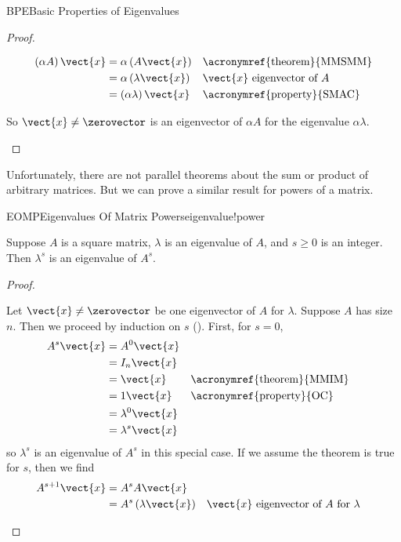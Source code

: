 \begin{subsect}{BPE}{Basic Properties of Eigenvalues}
\begin{proof}
\begin{para}
%
\begin{align*}
\left(\alpha A\right)\vect{x}&=\alpha\left(A\vect{x}\right)&&\text{\acronymref{theorem}{MMSMM}}\\
&=\alpha\left(\lambda\vect{x}\right)&&\text{$\vect{x}$ eigenvector of $A$}\\
&=\left(\alpha\lambda\right)\vect{x}&&\text{\acronymref{property}{SMAC}}
\end{align*}
\end{para}
%
\begin{para}So $\vect{x}\neq\zerovector$ is an eigenvector of $\alpha A$ for the eigenvalue $\alpha\lambda$.\end{para}
\end{proof}
%
\begin{para}Unfortunately, there are not parallel theorems about the sum or product of arbitrary matrices.  But we can prove a similar result for powers of a matrix.\end{para}
%
\begin{theorem}{EOMP}{Eigenvalues Of Matrix Powers}{eigenvalue!power}
\begin{para}Suppose $A$ is a square matrix, $\lambda$ is an eigenvalue of $A$, and $s\geq 0$ is an integer.  Then $\lambda^s$ is an eigenvalue of $A^s$.\end{para}
\end{theorem}
%
\begin{proof}
%
\begin{para}Let $\vect{x}\neq\zerovector$ be one eigenvector of $A$ for $\lambda$.  Suppose $A$ has size $n$.  Then we proceed by induction on $s$ ().  First, for $s=0$,
%
\begin{align*}
A^s\vect{x}&=A^0\vect{x}\\
&=I_n\vect{x}\\
&=\vect{x}&&\text{\acronymref{theorem}{MMIM}}\\
&=1\vect{x}&&\text{\acronymref{property}{OC}}\\
&=\lambda^0\vect{x}\\
&=\lambda^s\vect{x}\\
\end{align*}
%
so $\lambda^s$ is an eigenvalue of $A^s$ in this special case.  If we assume the theorem is true for $s$, then we find
%
\begin{align*}
A^{s+1}\vect{x}&=A^sA\vect{x}\\
&=A^s\left(\lambda\vect{x}\right)&&\text{$\vect{x}$ eigenvector of $A$ for $\lambda$}\\

\end{align*}
\end{para}
\end{proof}
\end{subsect}
